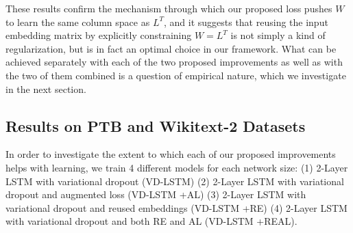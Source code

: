 These results confirm the mechanism through which our proposed loss pushes $W$ to learn the same column space as $L^T$, and it suggests that reusing the input embedding matrix by explicitly constraining $W=L^T$ is not simply a kind of regularization, but is in fact an optimal choice in our framework.
What can be achieved separately with each of the two proposed improvements as well as with the two of them combined is a question of empirical nature, which we investigate in the next section.

\subsection{Results on PTB and Wikitext-2 Datasets}
In order to investigate the extent to which each of our proposed improvements helps with learning, we train 4 different models for each network size:
(1) 2-Layer LSTM with variational dropout (VD-LSTM)
(2) 2-Layer LSTM with variational dropout and augmented loss (VD-LSTM +AL)
(3) 2-Layer LSTM with variational dropout and reused embeddings (VD-LSTM +RE)
(4) 2-Layer LSTM with variational dropout and both RE and AL (VD-LSTM +REAL).

